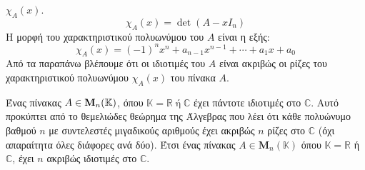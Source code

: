 \begin{rem}
\begin{myitemize}
      $ \mathcal{\chi}_{A} (x) $. 
      \[
        \mathcal{\chi}_{A} (x) = \det(A-xI_{n})
      \] 
      Η μορφή του χαρακτηριστικού πολυωνύμου του $A$ είναι η εξής:
      \[
        \mathcal{\chi}_{A} (x) = (-1)^{n}x^{n} + a_{n-1}x^{n-1} + \cdots + a_{1}x +
        a_{0}  
      \] 
      Από τα παραπάνω βλέπουμε ότι οι ιδιοτιμές του $A$ είναι ακριβώς οι ρίζες του 
      χαρακτηριστικού πολυωνύμου $ \mathcal{\chi}_{A} (x) $ του πίνακα $A$.
    \item Ένας πίνακας $ A \in \smash{\textbf{M}_{n}(\mathbb{K})} $, όπου $ \mathbb{K} =
      \mathbb{R} \; \text{ή} \; \mathbb{C} $  έχει πάντοτε ιδιοτιμές στο $ \mathbb{C} $.
      Αυτό προκύπτει από το θεμελιώδες θεώρημα της Άλγεβρας που λέει ότι κάθε πολυώνυμο 
      βαθμού $n$ με συντελεστές μιγαδικούς αριθμούς έχει ακριβώς $n$ ρίζες στο 
      $ \mathbb{C} $ (όχι απαραίτητα όλες διάφορες ανά δύο). Έτσι ένας πίνακας 
      $ A \in \textbf{M}_{n}(\mathbb{K}) $ όπου $ \mathbb{K}= \mathbb{R} $ ή 
      $ \mathbb{C} $, έχει $n$ ακριβώς ιδιοτιμές στο $ \mathbb{C} $.
  \end{myitemize}

\end{rem}



